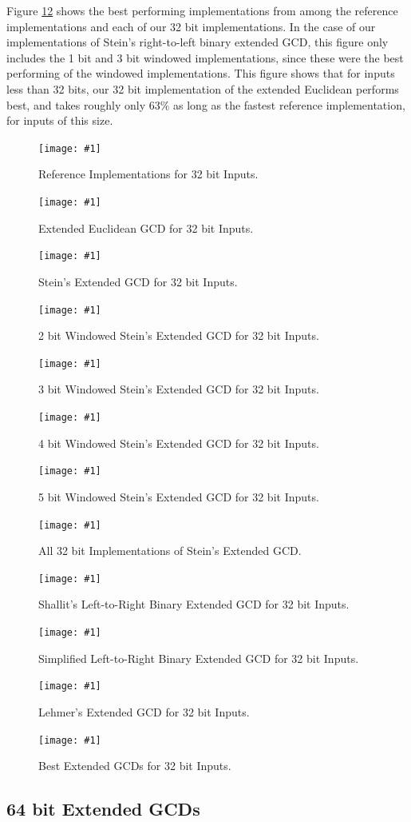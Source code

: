 \documentclass{ucalgthes1}
\theoremstyle{definition}
\newcommand{\mygraph}[3]{
	\begin{figure}[htb]
	\centering
	\texttt{[image: \#1]}
	\caption{#3}
	\label{#2}
	\end{figure}
}
\begin{document}
Figure \ref{fig:gcdBest32} shows the best performing implementations from among the reference implementations and each of our 32 bit implementations.  In the case of our implementations of Stein's right-to-left binary extended GCD, this figure only includes the 1 bit and 3 bit windowed implementations, since these were the best performing of the windowed implementations.  This figure shows that for inputs less than 32 bits, our 32 bit implementation of the extended Euclidean performs best, and takes roughly only 63\% as long as the fastest reference implementation, for inputs of this size.

\mygraph{reference-impl-32}{fig:gcdRef32}{Reference Implementations for 32 bit Inputs.}
\mygraph{divrem-32}{fig:gcdDivrem32}{Extended Euclidean GCD for 32 bit Inputs.}
\mygraph{stein1-32}{fig:gcdStein1-32}{Stein's Extended GCD for 32 bit Inputs.}
\mygraph{stein2-32}{fig:gcdStein2-32}{2 bit Windowed Stein's Extended GCD for 32 bit Inputs.}
\mygraph{stein3-32}{fig:gcdStein3-32}{3 bit Windowed Stein's Extended GCD for 32 bit Inputs.}
\mygraph{stein4-32}{fig:gcdStein4-32}{4 bit Windowed Stein's Extended GCD for 32 bit Inputs.}
\mygraph{stein5-32}{fig:gcdStein5-32}{5 bit Windowed Stein's Extended GCD for 32 bit Inputs.}
\mygraph{steins-32}{fig:gcdSteins32}{All 32 bit Implementations of Stein's Extended GCD.}
\mygraph{shallit-32}{fig:gcdShallit32}{Shallit's Left-to-Right Binary Extended GCD for 32 bit Inputs.}
\mygraph{binary_l2r-32}{fig:gcdL2R32}{Simplified Left-to-Right Binary Extended GCD for 32 bit Inputs.}
\mygraph{lehmer-32}{fig:gcdLehmer32}{Lehmer's Extended GCD for 32 bit Inputs.}
\mygraph{best-32}{fig:gcdBest32}{Best Extended GCDs for 32 bit Inputs.}

\clearpage

\subsection{64 bit Extended GCDs}
\end{document}
